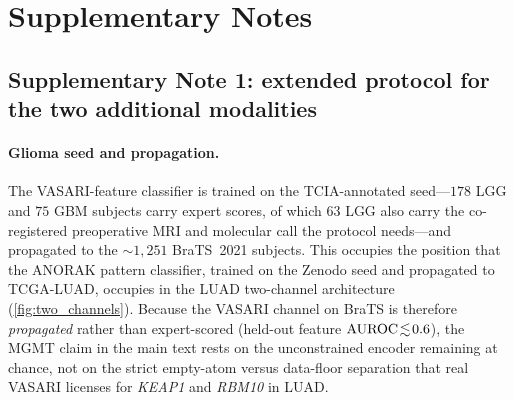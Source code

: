 \begin{table}[htbp]
\centering

\caption{\textbf{The three regimes as atoms of \cref{eq:pid}, with the
model-side signature that evidences each atom in LUAD.} Every regime in
the table is the pre-registered expectation against which the
adjudication of Table~2 was run, not an established assignment: no
fusion contrast excludes zero and none establishes equivalence at the
$\pm0.02$ margin, so all six genes remain unresolved. The table is
retained because the \emph{implied remedy} column is what the
decomposition adds over a cohort-mean \auroc{}, and because it separates
the three states one Inconclusive label conflates (empty, unestimable,
unconverted).}
\label{tab:pid_regimes}
\end{table}

\begin{table}[htbp]
\centering

\caption{Full per-condition electrocardiogram read-out with the
directional-criterion discussion, condensed into panel~(b) of
\cref{tab:crossdomain_merged}.}
\label{tab:ecg_domainc}
\end{table}

\FloatBarrier
\section*{Supplementary Notes}

\subsection*{Supplementary Note 1: extended protocol for the two
additional modalities}

\paragraph{Glioma seed and propagation.}
The VASARI-feature classifier is trained on the TCIA-annotated
seed---$178$ LGG and $75$ GBM subjects carry expert scores, of which $63$
LGG also carry the co-registered preoperative MRI and molecular call the
protocol needs---and propagated to the ${\sim}1{,}251$ BraTS~2021
subjects.\cite{baid2021brats} This occupies the position that the ANORAK
pattern classifier, trained on the Zenodo seed and propagated to
TCGA-LUAD, occupies in the LUAD two-channel architecture
(\cref{fig:two_channels}). Because the VASARI channel on BraTS is
therefore \emph{propagated} rather than expert-scored (held-out feature
$\text{AUROC}\!\lesssim\!0.6$), the MGMT claim in the main text rests on the
unconstrained encoder remaining at chance, not on the strict empty-atom
versus data-floor separation that real VASARI licenses for \textit{KEAP1}
and \textit{RBM10} in LUAD.

